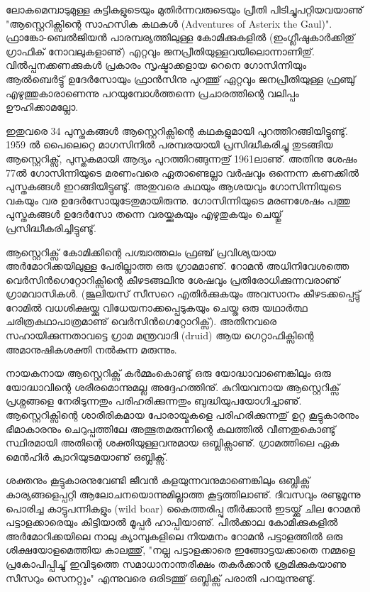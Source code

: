 ﻿
\vskip 2pt

ലോകമെമ്പാടുമുള്ള കുട്ടികളുടെയും മുതിര്‍ന്നവരുടെയും പ്രീതി പിടിച്ചുപറ്റിയവയാണു് "ആസ്റ്റെറിക്സിന്റെ സാഹസിക 
കഥകള്‍ (Adventures of Asterix the Gaul)".  ഫ്രാങ്കോ-ബെല്‍ജിയന്‍ പാരമ്പര്യത്തിലുള്ള കോമിക്കുകളില്‍ 
(ഇംഗ്ലീഷുകാര്‍ക്കിതു് ഗ്രാഫിക് നോവലുകളാണു്) എറ്റവും ജനപ്രീതിയുള്ളവയിലൊന്നാണിതു്. വില്‍പ്പനക്കണക്കുകള്‍ പ്രകാരം 
സൃഷ്ടാക്കളായ റെനെ ഗോസിന്നിയും ആല്‍ബെര്‍ട്ടു് ഉദേര്‍സോയും ഫ്രാന്‍സിനു പുറത്തു് ഏറ്റവും ജനപ്രീതിയുള്ള ഫ്രഞ്ചു് 
എഴുത്തുകാരാണെന്നു പറയുമ്പോള്‍ത്തന്നെ പ്രചാരത്തിന്റെ വലിപ്പം ഊഹിക്കാമല്ലോ.

ഇതുവരെ 34 പുസ്തകങ്ങള്‍ ആസ്റ്റെറിക്സിന്റെ കഥകളുമായി പുറത്തിറങ്ങിയിട്ടുണ്ടു്. 1959 ല്‍ പൈലെറ്റെ മാഗസിനില്‍ 
പരമ്പരയായി പ്രസിദ്ധീകരിച്ചു തുടങ്ങിയ ആസ്റ്റെറിക്സ്, പുസ്തകമായി ആദ്യം പുറത്തിറങ്ങുന്നതു് 1961ലാണു്. അതിനു 
ശേഷം 77ല്‍ ഗോസിന്നിയുടെ മരണംവരെ ഏതാണ്ടെല്ലാ വര്‍ഷവും ഒന്നെന്ന കണക്കില്‍ പുസ്തകങ്ങള്‍ ഇറങ്ങിയിട്ടുണ്ടു്. 
അതുവരെ കഥയും ആശയവും ഗോസിന്നിയുടെ വകയും വര ഉദേര്‍സോയുടേതുമായിരുന്നു. ഗോസിന്നിയുടെ മരണശേഷം 
പത്തു പുസ്തകങ്ങള്‍ ഉദേര്‍സോ തന്നെ വരയ്ക്കുകയും എഴുതുകയും ചെയ്തു് പ്രസിദ്ധീകരിച്ചിട്ടുണ്ടു്.

ആസ്റ്റെറിക്സ് കോമിക്കിന്റെ പശ്ചാത്തലം ഫ്രഞ്ച് പ്രവിശ്യയായ അര്‍മോറിക്കയിലുള്ള പേരില്ലാത്ത ഒരു ഗ്രാമമാണു്. 
റോമന്‍ അധിനിവേശത്തെ വെര്‍സിന്‍ഗെറ്റോറിക്സിന്റെ കീഴടങ്ങലിനു ശേഷവും പ്രതിരോധിക്കുന്നവരാണു് ഗ്രാമവാസികള്‍.
(ജൂലിയസ് സീസറെ എതിര്‍ക്കുകയും അവസാനം കീഴടക്കപ്പെട്ടു് റോമില്‍ വധശിക്ഷയ്ക്കു വിധേയനാക്കപ്പെടുകയും ചെയ്ത 
ഒരു യഥാര്‍ത്ഥ ചരിത്രകഥാപാത്രമാണു് വെര്‍സിന്‍ഗെറ്റോറിക്സ്). അതിനവരെ സഹായിക്കുന്നതാവട്ടെ ഗ്രാമ 
മന്ത്രവാദി (druid) ആയ ഗെറ്റാഫിക്സിന്റെ അമാനുഷികശക്തി നല്‍കുന്ന മരുന്നും.

നായകനായ ആസ്റ്റെറിക്സ് കര്‍മ്മംകൊണ്ടു് ഒരു യോദ്ധാവാണെങ്കിലും ഒരു യോദ്ധാവിന്റെ ശരീരമൊന്നുമല്ല അദ്ദേഹത്തിനു്. 
കുറിയവനായ ആസ്റ്റെറിക്സ് പ്രശ്നങ്ങളെ നേരിടുന്നതും പരിഹരിക്കുന്നതും ബുദ്ധിയുപയോഗിച്ചാണു്. ആസ്റ്റെറിക്സിന്റെ 
ശാരീരികമായ പോരായ്മകളെ പരിഹരിക്കുന്നതു് ഉറ്റ കൂട്ടുകാരനും ഭീമാകാരനും ചെറുപ്പത്തിലേ അത്ഭുതമരുന്നിന്റെ 
കലത്തില്‍ വീണതുകൊണ്ടു് സ്ഥിരമായി അതിന്റെ ശക്തിയുള്ളവനുമായ ഒബ്ലിക്സാണു്. ഗ്രാമത്തിലെ ഏക മെന്‍ഹിര്‍ 
ക്വാറിയുടമയാണു് ഒബ്ലിക്സ്.


ശക്തനും കൂട്ടുകാരനുവേണ്ടി ജീവന്‍ കളയുന്നവനുമാണെങ്കിലും ഒബ്ലിക്സ് കാര്യങ്ങളെപ്പറ്റി ആലോചനയൊന്നുമില്ലാത്ത 
കൂട്ടത്തിലാണു്. ദിവസവും രണ്ടുമൂന്നു പൊരിച്ച കാട്ടുപന്നികളും (wild boar) കൈത്തരിപ്പു തീര്‍ക്കാന്‍ ഇടയ്ക്കു് ചില റോമന്‍ 
പട്ടാളക്കാരെയും കിട്ടിയാല്‍ മൂപ്പര്‍ ഹാപ്പിയാണു്. പില്‍ക്കാല കോമിക്കുകളില്‍ അര്‍മോറിക്കയിലെ നാലു ക്യാമ്പുകളിലെ 
നിയമനം റോമന്‍ പട്ടാളത്തില്‍ ഒരു ശിക്ഷയോളമെത്തിയ കാലത്തു്, "നല്ല പട്ടാളക്കാരെ ഇങ്ങോട്ടയക്കാതെ നമ്മളെ 
പ്രകോപിപ്പിച്ചു് ഇവിടുത്തെ സമാധാനാന്തരീക്ഷം തകര്‍ക്കാന്‍ ശ്രമിക്കുകയാണു സീസറും സെനറ്റും" എന്നുവരെ ഒരിടത്തു് 
ഒബ്ലിക്സ് പരാതി പറയുന്നുണ്ടു്.

